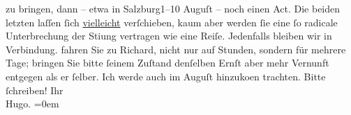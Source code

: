 \begin{ledgroupsized}[t]{13cm}
                    zu bringen, dann – etwa in Salzburg1–10 Auguſt – noch einen Act. Die beiden letzten laſſen ſich \uline{vielleicht} verſchieben, kaum aber {\pb}werden ſie eine ſo radicale
                    Unterbrechung der Sti{\geminationm}ung vertragen wie eine
                    Reiſe.\pend
           \pstart
           Jedenfalls bleiben wir in Verbindung. 
                    fahren Sie zu Richard, nicht nur auf
                    Stunden, sondern für mehrere Tage; bringen Sie bitte ſeinem Zuſtand denſelben
                    Ernſt aber mehr {\pb}Vernunft
                    entgegen als er ſelber. Ich werde auch im Auguſt hinzuko{\geminationm}en trachten.\pend
           \pstart
           Bitte ſchreiben!\pend
           \pstart
           Ihr{\\[\baselineskip]}\spacefill\mbox{Hugo.}\pend
           \leftskip=0em{}\endnumbering{}\end{ledgroupsized}  \newcommand{\dateiname}{L00944}\newcommand{\titel}{Hugo von Hofmannsthal an Arthur Schnitzler, 15. 7. [1899]}\newcommand{\editorInnen}{Martin Anton Müller und Gerd-Hermann Susen}
      